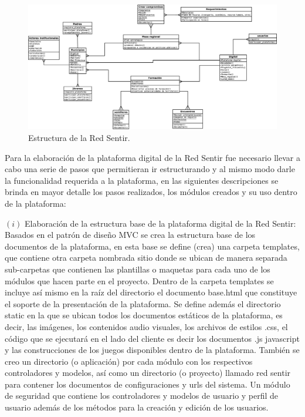 \documentclass[journal,transmag]{IEEEtran}
\begin{document}
\begin{figure}[t]
\centering
\includegraphics[width=1\linewidth]{red.eps}
\caption{Estructura de la Red Sentir.}
\label{fig:red}
\end{figure}

Para la elaboración de la plataforma digital de la Red Sentir fue necesario llevar a cabo una serie de pasos que permitieran ir estructurando y al mismo modo darle la funcionalidad requerida a la plataforma, en las siguientes descripciones se brinda en mayor detalle los pasos realizados, los módulos creados y su uso dentro de la plataforma:

$(i)$ Elaboración de la estructura base de la plataforma digital de la Red Sentir: Basados en el patrón de diseño MVC se crea la estructura base de los documentos de la plataforma, en esta base se define (crea) una carpeta templates, que contiene otra carpeta nombrada sitio donde se ubican de manera separada sub-carpetas que contienen las plantillas o maquetas para cada uno de los módulos que hacen parte en el proyecto. Dentro de la carpeta templates se incluye así mismo en la raíz del directorio el documento base.html que constituye el soporte de la presentación de la plataforma. Se define además el directorio static en la que se ubican todos los documentos estáticos de la plataforma, es decir, las imágenes, los contenidos audio visuales, los archivos de estilos .css, el código que se ejecutará en el lado del cliente es decir los documentos .js javascript y las construcciones de los juegos disponibles dentro de la plataforma. También se creo un directorio (o aplicación) por cada módulo con los respectivos controladores y modelos, así como un directorio (o proyecto) llamado red sentir para contener los documentos de configuraciones y urls del sistema. Un módulo de seguridad que contiene los controladores y modelos de usuario y perfil de usuario además de los métodos para la creación y edición de los usuarios.
\end{document}
